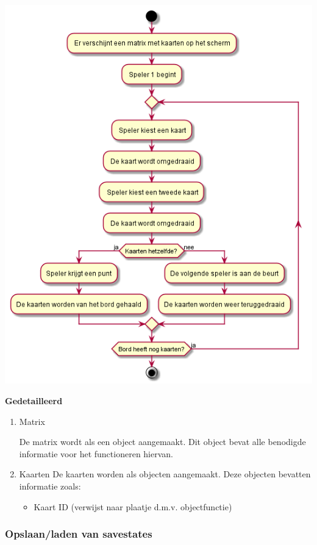 \documentclass[a4paper,titlepage,11pt]{article}
\begin{document}
\begin{center}
\includegraphics[width=\linewidth]{../Images/diagram.png}
\end{center}

{\bf Gedetailleerd}

\begin{enumerate}
\item Matrix

De matrix wordt als een object aangemaakt. 
Dit object bevat alle benodigde informatie
voor het functioneren hiervan.

\item Kaarten
De kaarten worden als objecten aangemaakt. Deze objecten bevatten informatie zoals:

\begin{itemize}
\item Kaart ID (verwijst naar plaatje d.m.v. objectfunctie)
\end{itemize}
\end{enumerate}

\subsubsection{Opslaan/laden van savestates}
\end{document}
